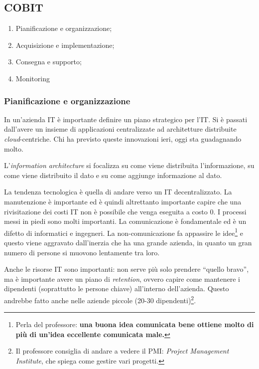 \subsection{COBIT}
\label{COBIT}

\begin{enumerate}
  \item Pianificazione e organizzazione;
  \item Acquisizione e implementazione;
  \item Consegna e supporto;
  \item Monitoring
\end{enumerate}

\subsubsection{Pianificazione e organizzazione}

In un'azienda IT è importante definire un piano strategico per l'IT. Si è 
passati dall'avere un insieme di applicazioni centralizzate ad architetture 
distribuite \textit{cloud}-centriche. Chi ha previsto queste innovazioni ieri, 
oggi sta guadagnando molto.

L'\textit{information architecture} si focalizza su come viene distribuita
l'informazione, su come viene distribuito il dato e su come aggiunge
informazione al dato.

La tendenza tecnologica è quella di andare verso un IT decentralizzato. La 
manutenzione è importante ed è quindi altrettanto importante capire che una 
rivisitazione dei costi IT non è possibile che venga eseguita a costo 0. I 
processi messi in piedi sono molti importanti. La comunicazione è fondamentale 
ed è un difetto di informatici e ingegneri. La non-comunicazione fa appassire 
le idee\footnote{Perla del professore: \textbf{una buona idea comunicata bene 
ottiene molto di più di un'idea eccellente comunicata male.}} e questo viene 
aggravato dall'inerzia che ha una grande azienda, in quanto un gran numero di 
persone si muovono lentamente tra loro.

Anche le risorse IT sono importanti: non serve più solo prendere ``quello
bravo'', ma è importante avere un piano di \textit{retention}, ovvero capire
come mantenere i dipendenti (soprattutto le persone chiave) all'interno
dell'azienda. Questo andrebbe fatto anche nelle aziende piccole (20-30
dipendenti)\footnote{Il professore consiglia di andare a vedere il PMI:
\textit{Project Management Institute}, che spiega come gestire vari progetti.}.

